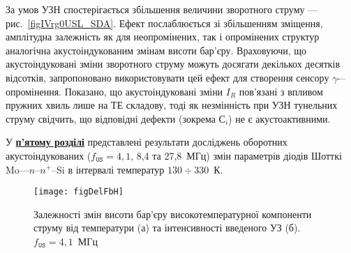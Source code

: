 За умов УЗН спостерігається збільшення величини зворотного струму --- рис.~\ref{figIVrg0USL_SDA}.
Ефект послаблюється зі збільшенням зміщення, амплітудна залежність як для неопромінених, так і опромінених структур аналогічна акустоіндукованим змінам висоти бар'єру.
Враховуючи, що акустоіндуковані зміни зворотного струму можуть досягати декількох десятків відсотків,
запропоновано використовувати цей ефект для створення сенсору $\gamma$-–опромінення.
Показано, що акустоіндуковані зміни $I_R$ пов'язані з впливом пружних хвиль лише на ТЕ складову,
тоді як незмінність при УЗН тунельних струму свідчить, що відповідні дефекти (зокрема С$_i$) не є акустоактивними.


У  \underline{\textbf{п'ятому розділі}} представлені результати досліджень
оборотних акустоіндукованих ($f_\mathtt{US}=4,1$, 8,4 та 27,8~МГц) змін параметрів діодів Шотткі Mo---$n$--$n^+$--Si в інтервалі температур $130\div330$~К.

\begin{figure}
\center
\texttt{[image: figDelFbH]}
\caption{\label{figDelFbH}
Залежності змін висоти бар'єру високотемпературної компоненти струму від температури (а) та інтенсивності введеного УЗ (б).
$f_\mathtt{US}=4,1$~МГц
}%
\end{figure}

